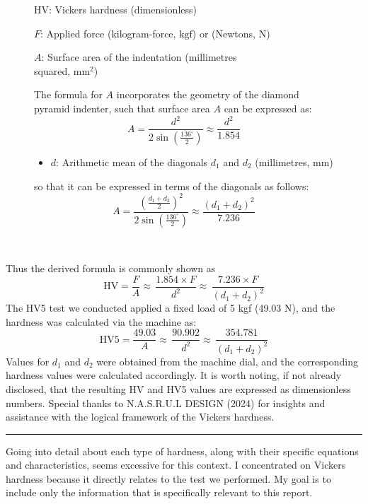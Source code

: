 \documentclass{article}
\newcommand{\wm}[1]{%
    \begin{minipage}{1\textwidth}
        #1
    \end{minipage}%
}
\begin{document}
\begin{figure}[H]
\begin{minipage}{0.51\textwidth}
\begin{itemize}[itemsep=-1mm]
                \item HV: Vickers hardness (dimensionless)
                \item \(F\): Applied force (kilogram-force, \(\text{kgf}\)) or (Newtons, \(\text{N}\))
                \wm{\item \(A\): Surface area of the indentation (millimetres \\squared, \(\text{mm}^2\))}            
            \end{itemize}
            The formula for $A$ incorporates the geometry of the diamond pyramid indenter, such that surface area \(A\) can be expressed as:
            \begin{equation}
                A = \frac{d^2}{2\sin\left(\frac{136^\circ}{2}\right)} \approx \frac{d^2}{1.854} 
            \end{equation}
            \begin{itemize}[itemsep=-1mm]
                \item \( d \): Arithmetic mean of the diagonals \( d_1 \) and \( d_2 \) (millimetres, \(\text{mm}\))
            \end{itemize}
            so that it can be expressed in terms of the diagonals as follows:
            \begin{equation}
                A= \frac{\left(\frac{d_1+d_2}{2}\right)^2}{2\sin\left(\frac{136^\circ}{2}\right)} \approx \frac{\left(d_1 + d_2\right)^2}{7.236}
            \end{equation}
        \end{minipage}\\
    \end{figure}
    \vspace{-1em}\newpage\noindent
    Thus the derived formula is commonly shown as
    \begin{equation}
        {\text{HV} = \frac{F}{A} \approx \, \frac{1.854 \times F}{d^2} \approx \, \frac{7.236\times F}{\left(d_1 + d_2\right)^2}}    
    \end{equation} 
    The HV5 test we conducted applied a fixed load of 5 kgf (49.03 N), and the hardness was calculated via the machine as:  
    \begin{equation}
        \text{HV5} = \frac{49.03}{A} \approx \, \frac{90.902}{d^2} \approx \, \frac{354.781}{\left(d_1 + d_2\right)^2}
    \end{equation}
    Values for \(d_1\) and \(d_2\) were obtained from the machine dial, and the corresponding hardness values were calculated accordingly. It is worth noting, if not already disclosed, that the resulting HV and HV5 values are expressed as dimensionless numbers. Special thanks to N.A.S.R.U.L DESIGN (2024) for insights and assistance with the logical framework of the Vickers hardness.\\[1em]
    \hrule\vspace{1em}
    Going into detail about each type of hardness, along with their specific equations and characteristics, seems excessive for this context. I concentrated on Vickers hardness because it directly relates to the test we performed. My goal is to include only the information that is specifically relevant to this report.
    
\end{document}
